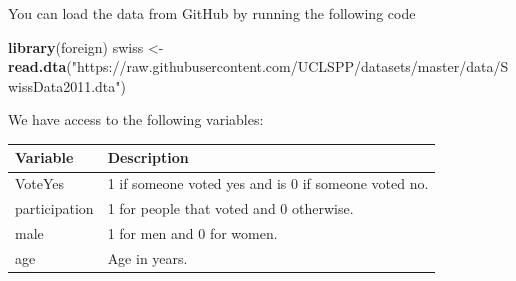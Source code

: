 \documentclass[]{article}
\newenvironment{Shaded}{\begin{snugshade}}{\end{snugshade}}
\newcommand{\KeywordTok}[1]{\textcolor[rgb]{0.13,0.29,0.53}{\textbf{#1}}}
\newcommand{\StringTok}[1]{\textcolor[rgb]{0.31,0.60,0.02}{#1}}
\newcommand{\NormalTok}[1]{#1}
\theoremstyle{definition}
\theoremstyle{definition}
\theoremstyle{definition}
\theoremstyle{remark}
\begin{document}
You can load the data from GitHub by running the following code

\begin{Shaded}
\begin{Highlighting}[]
\KeywordTok{library}\NormalTok{(foreign)}
\NormalTok{swiss <-}\StringTok{ }\KeywordTok{read.dta}\NormalTok{(}\StringTok{"https://raw.githubusercontent.com/UCLSPP/datasets/master/data/SwissData2011.dta"}\NormalTok{)}
\end{Highlighting}
\end{Shaded}

We have access to the following variables:

\begin{longtable}[]{@{}ll@{}}
\toprule
\begin{minipage}[b]{0.11\columnwidth}\raggedright\strut
Variable\strut
\end{minipage} & \begin{minipage}[b]{0.83\columnwidth}\raggedright\strut
Description\strut
\end{minipage}\tabularnewline
\midrule
\endhead
\begin{minipage}[t]{0.11\columnwidth}\raggedright\strut
VoteYes\strut
\end{minipage} & \begin{minipage}[t]{0.83\columnwidth}\raggedright\strut
1 if someone voted yes and is 0 if someone voted no.\strut
\end{minipage}\tabularnewline
\begin{minipage}[t]{0.11\columnwidth}\raggedright\strut
participation\strut
\end{minipage} & \begin{minipage}[t]{0.83\columnwidth}\raggedright\strut
1 for people that voted and 0 otherwise.\strut
\end{minipage}\tabularnewline
\begin{minipage}[t]{0.11\columnwidth}\raggedright\strut
male\strut
\end{minipage} & \begin{minipage}[t]{0.83\columnwidth}\raggedright\strut
1 for men and 0 for women.\strut
\end{minipage}\tabularnewline
\begin{minipage}[t]{0.11\columnwidth}\raggedright\strut
age\strut
\end{minipage} & \begin{minipage}[t]{0.83\columnwidth}\raggedright\strut
Age in years.\strut
\end{minipage}\tabularnewline

\end{longtable}
\end{document}
